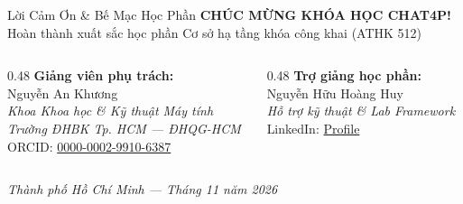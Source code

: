 \begin{frame}{Lời Cảm Ơn \& Bế Mạc Học Phần}
  \centering
  {\Huge\sffamily\bfseries\color{hcmutblue} CHÚC MỪNG KHÓA HỌC CHAT4P!}\\[0.4cm]
  {\Large\sffamily\color{solgreen} Hoàn thành xuất sắc học phần Cơ sở hạ tầng khóa công khai (ATHK 512)}\\[1.2cm]

  \begin{columns}[T]
    \begin{column}{0.48\textwidth}
      \centering
      \textbf{Giảng viên phụ trách:}\\
      Nguyễn An Khương\\
      {\footnotesize\textit{Khoa Khoa học \& Kỹ thuật Máy tính}}\\
      {\footnotesize\textit{Trường ĐHBK Tp. HCM --- ĐHQG-HCM}}\\
      {\scriptsize ORCID: \href{https://orcid.org/0000-0002-9910-6387}{0000-0002-9910-6387}}
    \end{column}
    \begin{column}{0.48\textwidth}
      \centering
      \textbf{Trợ giảng học phần:}\\
      Nguyễn Hữu Hoàng Huy\\
      {\footnotesize\textit{Hỗ trợ kỹ thuật \& Lab Framework}}\\
      {\scriptsize LinkedIn: \href{https://www.linkedin.com/in/nguyen-huu-hoang-huy-abb138366/}{Profile}}
    \end{column}
  \end{columns}

  \vspace{1.0cm}
  {\small\itshape\color{gray} Thành phố Hồ Chí Minh --- Tháng 11 năm 2026}
\end{frame}


